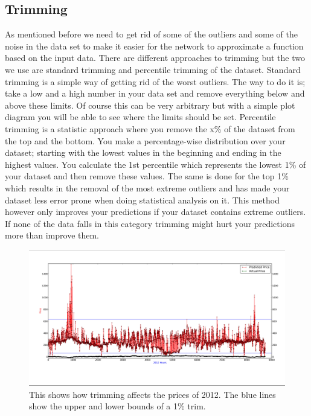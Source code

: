 \subsection{Trimming}\label{sec:Trimming}
As mentioned before we need to get rid of some of the outliers and some of the noise in the data set to make it easier for the network to approximate a function based on the input data. There are different approaches to trimming but the two we use are standard trimming and percentile trimming of the dataset. Standard trimming is a simple way of getting rid of the worst outliers. The way to do it is; take a low and a high number in your data set and remove everything below and above these limits. Of course this can be very arbitrary but with a simple plot diagram you will be able to see where the limits should be set. Percentile trimming is a statistic approach where you remove the x\% of the dataset from the top and the bottom. You make a percentage-wise distribution over your dataset; starting with the lowest values in the beginning and ending in the highest values. You calculate the 1st percentile which represents the lowest 1\% of your dataset and then remove these values. The same is done for the top 1\% which results in the removal of the most extreme outliers and has made your dataset less error prone when doing statistical analysis on it. This method however only improves your predictions if your dataset contains extreme outliers. If none of the data falls in this category trimming might hurt your predictions more than improve them.

\begin{figure}[!ht]
\centering
\includegraphics[width=\linewidth,natwidth=898,natheight=587]{billeder/trimming_graph.jpg}
\caption{This shows how trimming affects the prices of 2012. The blue lines show the upper and lower bounds of a 1\% trim.}
\label{fig:trimming_in_trimming_section}
\end{figure}

